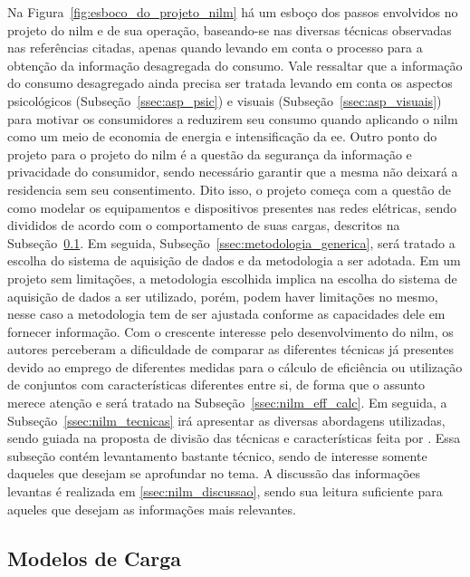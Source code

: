 Na Figura~\ref{fig:esboco_do_projeto_nilm} há um esboço dos passos
envolvidos no projeto do \acs{nilm} e de sua operação, baseando-se nas
diversas técnicas observadas nas referências citadas, apenas quando
levando em conta o processo para a obtenção da informação desagregada
do consumo. Vale ressaltar que a informação do consumo desagregado
ainda precisa ser tratada levando em conta os aspectos psicológicos
(Subseção~\ref{ssec:asp_psic}) e visuais
(Subseção~\ref{ssec:asp_visuais}) para motivar os consumidores a
reduzirem seu consumo quando aplicando o \acs{nilm} como um meio de
economia de energia e intensificação da \gls{ee}. Outro ponto do
projeto para o projeto do \acs{nilm} é a questão da segurança da
informação e privacidade do consumidor, sendo necessário garantir que
a mesma não deixará a residencia sem seu consentimento. Dito isso, o
projeto começa com a questão de como modelar os equipamentos e
dispositivos presentes nas redes elétricas, sendo divididos de acordo
com o comportamento de suas cargas, descritos na
Subseção~\ref{ssec:modelos_carga}. Em seguida,
Subseção~\ref{ssec:metodologia_generica}, será tratado a escolha
do sistema de aquisição de dados e da metodologia a ser adotada. Em um
projeto sem limitações, a metodologia escolhida implica na escolha do
sistema de aquisição de dados a ser utilizado, porém, podem haver
limitações no mesmo, nesse caso a metodologia tem de ser ajustada
conforme as capacidades dele em fornecer informação. Com o crescente
interesse pelo desenvolvimento do \acs{nilm}, os autores perceberam a
dificuldade de comparar as diferentes técnicas já presentes devido ao
emprego de diferentes medidas para o cálculo de eficiência ou
utilização de conjuntos com características diferentes entre si, de
forma que o assunto merece atenção e será tratado na
Subseção~\ref{ssec:nilm_eff_calc}. Em seguida, a
Subseção~\ref{ssec:nilm_tecnicas} irá apresentar as diversas
abordagens utilizadas, sendo guiada na proposta de divisão das
técnicas e características feita por \cite{nilm_zeifman_review_2011}.
Essa subseção contém levantamento bastante técnico, sendo de
interesse somente daqueles que desejam se aprofundar no tema.  A
discussão das informações levantas é realizada em
\ref{ssec:nilm_discussao}, sendo sua leitura suficiente para
aqueles que desejam as informações mais relevantes.

\subsection{Modelos de Carga}
\label{ssec:modelos_carga}

